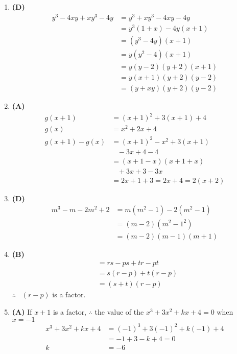 \begin{multicols}{2}
\begin{enumerate}[label={\textbf{\arabic*.}}]
    \item \textbf{(D)} 
        \begin{align*}
            y^3 - 4xy + xy^3 - 4y &= y^3 + xy^3 - 4xy - 4y \\
            &= {y}^{3}(1 + x) - 4y(x + 1) \\
            &= (y^3 - 4y)(x + 1) \\
            &= y(y^2 - 4)(x + 1) \\
            &= y(y - 2)(y + 2)(x + 1) \\
            &= y(x + 1)(y + 2)(y - 2) \\
            &= (y + xy)(y + 2)(y - 2)
        \end{align*}
    
    \item \textbf{(A)} \begin{align*}
        g(x + 1) &= (x + 1) ^2 + 3(x + 1) + 4  \\
        g(x) & = x^2 + 2x + 4 \\
        g(x + 1) - g(x) & = (x+ 1)^2 - x^2 + 3(x+1)  \\
        & \hspace{10pt} - 3x + 4 - 4 \\
        & = (x + 1 - x)(x + 1 + x) \\
        &\hspace{10pt} + 3x + 3 - 3x \\
        & = 2x + 1 + 3 = 2x + 4 = 2(x + 2)
    \end{align*}
    
    \item \textbf{(D)} \begin{align*} 
        m^3 - m -2m^2 + 2 &= m(m^2 -1) -2 (m^2 -1) \\
        & = (m - 2)(m^2 - 1^2) \\
        & = (m-2)(m-1)(m+1)
    \end{align*}

    \item \textbf{(B)} \begin{align*} 
        & = rs -ps + tr - pt \\
        & = s(r-p) + t(r-p) \\
        & = (s + t)(r-p)
    \end{align*}
    $\therefore \hspace{10pt} (r-p) $ is a factor.

    \item \textbf{(A)} If $x + 1$ is a factor, $\therefore$ the value of the $x^3 + 3x^2 + kx + 4 = 0$ when $x = -1$ \\
    \begin{align*}
        x^3 + 3x^2 + kx + 4 &= (-1)^3 + 3(-1)^2 +k(-1) + 4 \\
        & = -1 + 3 -k + 4 = 0 \\
        k & = -6 
    \end{align*}


\end{enumerate}
\end{multicols}
